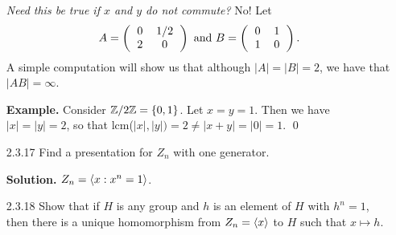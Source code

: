 \begin{enumerate}
      \textit{Need this be true if $x$ and $y$ do not commute?} No! Let
      $$
         A = \left(\begin{tabular}{cc}
            0 & 1/2 \\
            2 & 0
         \end{tabular}\right) \text{ and }
         B = \left(\begin{tabular}{cc}
            0 & 1 \\
            1 & 0
         \end{tabular}\right).
      $$
      A simple computation will show us that although $|A| = |B| = 2$, we have
      that $|AB| = \infty$.
      
      \textbf{Example.} Consider $\mathbb{Z}/2\mathbb{Z} = \{0, 1\}$. Let $x = y = 1$. Then we
      have $|x| = |y| = 2$, so that lcm($|x|, |y|) = 2 \neq |x + y| = |0| = 1$.
      \qed
   \item[2.3.17]  Find a presentation for $Z_n$ with one generator.
   
      \textbf{Solution.} $Z_n = \langle x : x^n = 1 \rangle$.
   \item[2.3.18]  Show that if $H$ is any group and $h$ is an element of $H$
                  with $h^n = 1$, then there is a unique homomorphism from
                  $Z_n = \langle x \rangle$ to $H$ such that $x \mapsto h$.
                  

\end{enumerate}
